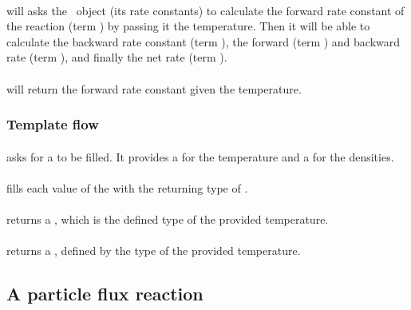 \paragraph{\Reaction} will asks the \KineticsType\ object (its rate constants) to calculate
the forward rate constant of the reaction (term \fwdratecons[r]) by passing
it the temperature. Then it will be able 
to calculate the backward rate constant (term \bkwdratecons[r]), 
the forward (term \fwdrate[r]) and backward rate (term \bkwdrate[r]), 
and finally the net rate (term \rate[r]).

\paragraph{\KineticsType} will return the forward rate constant \fwdratecons[r] given
the temperature.

\subsubsection{Template flow}

\paragraph{\KineticsEvaluator} asks for a  to be filled. It
provides a  for the temperature and a  for
the densities.

\paragraph{\ReactionSet} fills each value of the  with
the returning type of \Reaction.

\paragraph{\Reaction} returns a , which is the defined type of the
provided temperature.

\paragraph{\KineticsType} returns a , defined by the type of the
provided temperature.

\subsection{A particle flux reaction}

